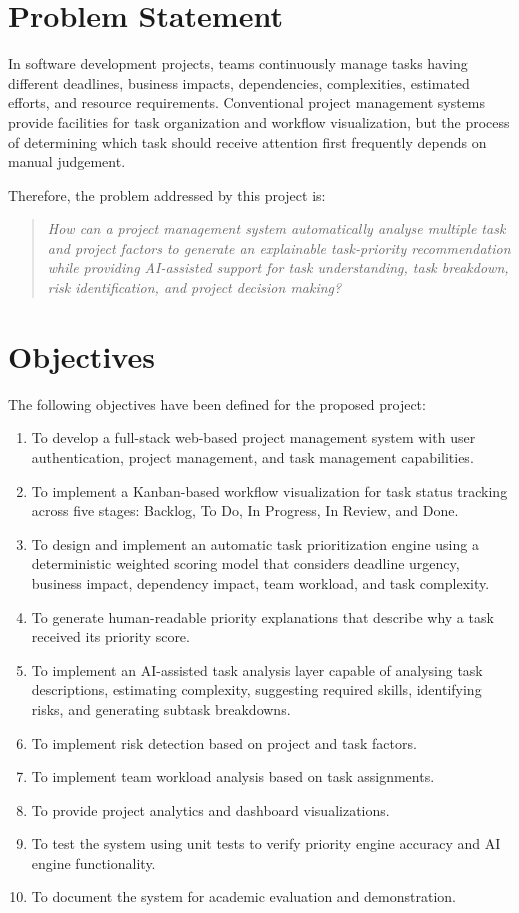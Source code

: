 \documentclass[12pt,a4paper,oneside]{report}
\begin{document}
\section{Problem Statement}

In software development projects, teams continuously manage tasks having different deadlines, business impacts, dependencies, complexities, estimated efforts, and resource requirements. Conventional project management systems provide facilities for task organization and workflow visualization, but the process of determining which task should receive attention first frequently depends on manual judgement.

Therefore, the problem addressed by this project is:

\begin{quote}
\textit{How can a project management system automatically analyse multiple task and project factors to generate an explainable task-priority recommendation while providing AI-assisted support for task understanding, task breakdown, risk identification, and project decision making?}
\end{quote}

\section{Objectives}

The following objectives have been defined for the proposed project:

\begin{enumerate}[noitemsep]
  \item To develop a full-stack web-based project management system with user authentication, project management, and task management capabilities.
  \item To implement a Kanban-based workflow visualization for task status tracking across five stages: Backlog, To Do, In Progress, In Review, and Done.
  \item To design and implement an automatic task prioritization engine using a deterministic weighted scoring model that considers deadline urgency, business impact, dependency impact, team workload, and task complexity.
  \item To generate human-readable priority explanations that describe why a task received its priority score.
  \item To implement an AI-assisted task analysis layer capable of analysing task descriptions, estimating complexity, suggesting required skills, identifying risks, and generating subtask breakdowns.
  \item To implement risk detection based on project and task factors.
  \item To implement team workload analysis based on task assignments.
  \item To provide project analytics and dashboard visualizations.
  \item To test the system using unit tests to verify priority engine accuracy and AI engine functionality.
  \item To document the system for academic evaluation and demonstration.
\end{enumerate}
\end{document}
